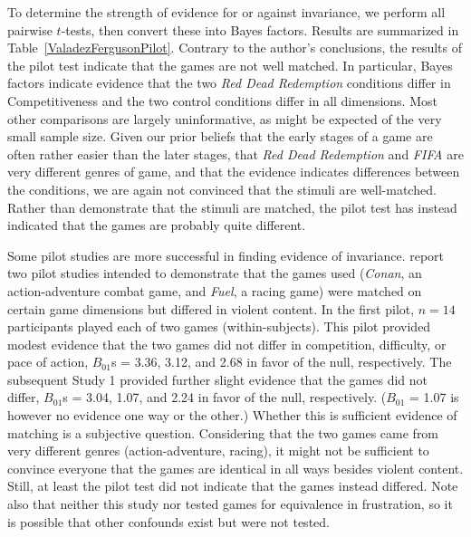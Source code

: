 \documentclass[man]{apa6}
\begin{document}
To determine the strength of evidence for or against invariance, we perform all pairwise $t$-tests, then convert these into Bayes factors. Results are summarized in Table~\ref{ValadezFergusonPilot}. Contrary to the author's conclusions, the results of the pilot test indicate that the games are not well matched. In particular, Bayes factors indicate evidence that the two {\em Red Dead Redemption} conditions differ in Competitiveness and the two control conditions differ in all dimensions. Most other comparisons are largely uninformative, as might be expected of the very small sample size. Given our prior beliefs that the early stages of a game are often rather easier than the later stages, that {\em Red Dead Redemption} and {\em FIFA} are very different genres of game, and that the evidence indicates differences between the conditions, we are again not convinced that the stimuli are well-matched. Rather than demonstrate that the stimuli are matched, the pilot test has instead indicated that the games are probably quite different. %

Some pilot studies are more successful in finding evidence of invariance. \citet{Adachi:Willoughby:2011} report two pilot studies intended to demonstrate that the games used ({\em Conan}, an action-adventure combat game, and {\em Fuel}, a racing game) were matched on certain game dimensions but differed in violent content. In the first pilot, $n = 14$ participants played each of two games (within-subjects). This pilot provided modest evidence that the two games did not differ in competition, difficulty, or pace of action, $B_{01}$s = 3.36, 3.12, and 2.68 in favor of the null, respectively. The subsequent Study 1 provided further slight evidence that the games did not differ, $B_{01}$s = 3.04, 1.07, and 2.24 in favor of the null, respectively. ($B_{01}$ = 1.07 is however no evidence one way or the other.) Whether this is sufficient evidence of matching is a subjective question. Considering that the two games came from very different genres (action-adventure, racing), it might not be sufficient to convince everyone that the games are identical in all ways besides violent content. Still, at least the pilot test did not indicate that the games instead differed. Note also that neither this study nor \citet{Valadez:Ferguson:2012} tested games for equivalence in frustration, so it is possible that other confounds exist but were not tested.
\end{document}
